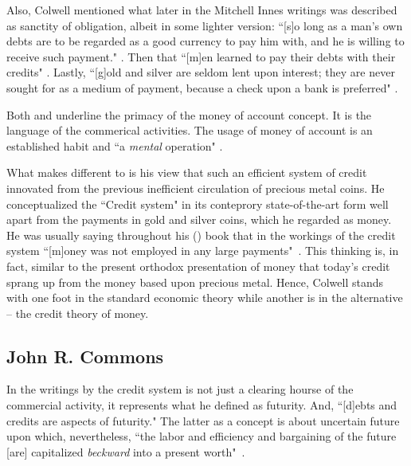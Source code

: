 Also, Colwell mentioned what later in the Mitchell Innes writings  was described as sanctity of obligation, albeit in some lighter version: ``[s]o long as a man's own debts are to be regarded as a good currency to pay him with, and he is willing to receive such payment." \citeyearpar[p.~691]{colwell1860}. Then that ``[m]en learned to pay their debts with their credits" \citeyearpar[p.~691]{colwell1860}. Lastly, ``[g]old and silver are seldom lent upon interest; they are never sought for as a medium of payment, because a check upon a bank is preferred" \citeyearpar[p.~694]{colwell1860}. 

Both \citeauthor{colwell1859} and \citeauthor{innes1913} underline the primacy of the money of account concept. It is the language of the commerical activities. The usage of money of account is an established habit and ``a \textit{mental} operation" \citep[p.~3, emphasis added]{colwell1859}. 

What makes \citeauthor{colwell1859} different to \citeauthor{innes1913} is his view that such an efficient system of credit innovated from the previous inefficient circulation of precious metal coins. He conceptualized the ``Credit system" in its conteprory state-of-the-art form well apart from the payments in gold and silver coins, which he regarded as money. He was usually saying throughout his (\citeyear{colwell1859}) book that in the workings of the credit system ``[m]oney was not employed in any large payments"~\citep[p.~190]{colwell1859}.   This thinking is, in fact, similar to the present orthodox presentation of money that today's credit sprang up from the money based upon precious metal. Hence, Colwell stands with one foot in the standard economic theory while another is in the alternative -- the credit theory of money. 

%
%
\subsection{John R. Commons}

In the writings by \citeauthor{commons1951} the credit system is not just a clearing hourse of the commercial activity, it represents what he defined as futurity. And, ``[d]ebts and credits are aspects of futurity." The latter as a concept is about uncertain future upon which, nevertheless, ``the labor and efficiency and bargaining of the future [are] capitalized \textit{beckward} into a present worth"~\citep[p.~103,105]{commons1951}.

